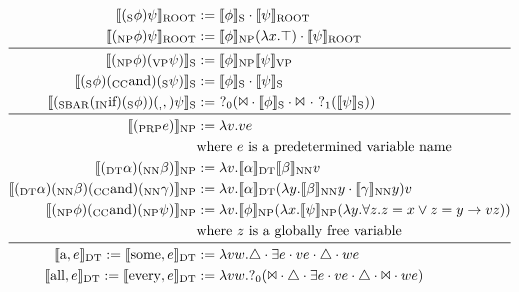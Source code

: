 \documentclass[12pt]{article}
\begin{document}
\begin{equation*}\begin{aligned}
\ \llbracket (_\text{S}\phi)\psi\rrbracket_\text{ROOT} &:= \llbracket \phi\rrbracket_\text{S}\cdot\llbracket \psi\rrbracket_\text{ROOT}\\
\llbracket (_\text{NP}\phi)\psi\rrbracket_\text{ROOT} &:= \llbracket \phi\rrbracket_\text{NP}(\lambda x.\top)\cdot\llbracket \psi\rrbracket_\text{ROOT}\\
\midrule\ 
%
\llbracket (_\text{NP}\phi) (_\text{VP}\psi)\rrbracket_\text{S} &:= \llbracket \phi\rrbracket_\text{NP} \llbracket \psi\rrbracket_\text{VP}\\
\llbracket (_\text{S}\phi) (_\text{CC}\text{and}) (_\text{S}\psi)\rrbracket_\text{S} &:= \llbracket \phi\rrbracket_\text{S} \cdot \llbracket \psi\rrbracket_\text{S}\\
\llbracket (_\text{SBAR}(_\text{IN}\text{if})(_\text{S}\phi))(_\text{,},)\psi\rrbracket_\text{S} &:=\ ?_0(\Bowtie\cdot \llbracket \phi\rrbracket_\text{S}\cdot\Bowtie\ \cdot\ ?_1(\llbracket \psi\rrbracket_\text{S}))\\
\midrule\ 
%
\llbracket (_\text{PRP}e)\rrbracket_\text{NP} &:= \lambda v . ve\\
&\text{where $e$ is a predetermined variable name}\\
\llbracket (_\text{DT}\alpha) (_\text{NN}\beta)\rrbracket_\text{NP} &:= \lambda v . \llbracket \alpha\rrbracket_\text{DT} \llbracket \beta\rrbracket_\text{NN} v\\
\llbracket (_\text{DT}\alpha) (_\text{NN}\beta) (_\text{CC}\text{and}) (_\text{NN}\gamma)\rrbracket_\text{NP} &:= \lambda v . \llbracket \alpha\rrbracket_\text{DT} (\lambda y. \llbracket \beta\rrbracket_\text{NN}y \cdot \llbracket \gamma\rrbracket_\text{NN}y) v\\
\llbracket (_\text{NP}\phi) (_\text{CC}\text{and}) (_\text{NP}\psi)\rrbracket_\text{NP} &:= \lambda v.\llbracket \phi\rrbracket_\text{NP}(\lambda x.\llbracket \psi\rrbracket_\text{NP}(\lambda y.\forall z.z=x \vee z=y \rightarrow vz))\\
& \text{where $z$ is a globally free variable}\\
\midrule\ 
%
\llbracket \text{a}, e\rrbracket_\text{DT} := \llbracket \text{some}, e\rrbracket_\text{DT} &:= \lambda vw.\triangle\cdot\exists e\cdot ve\cdot\triangle\cdot we\\
\llbracket \text{all}, e\rrbracket_\text{DT} := \llbracket \text{every}, e\rrbracket_\text{DT} &:= \lambda vw.?_0(\Bowtie\cdot\triangle\cdot\exists e\cdot ve\cdot\triangle\cdot\Bowtie\cdot we)\\

\end{aligned}
\end{equation*}
\end{document}
